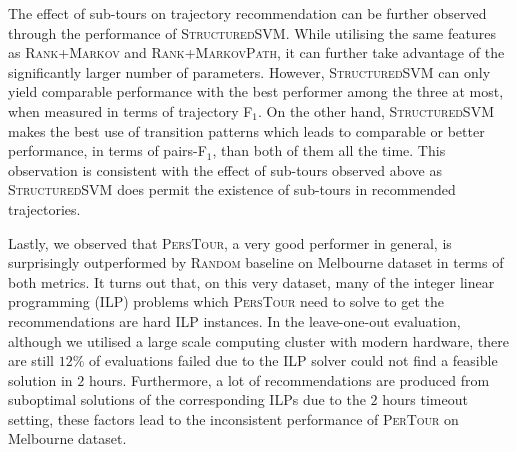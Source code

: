 The effect of sub-tours on trajectory recommendation can be further observed through the performance of \textsc{StructuredSVM}.
%
While utilising the same features as \textsc{Rank+Markov} and \textsc{Rank+MarkovPath},
it can further take advantage of the significantly larger number of parameters.
However, \textsc{StructuredSVM} can only yield comparable performance with the best performer 
among the three at most, when measured in terms of trajectory F$_1$.
On the other hand, \textsc{StructuredSVM} makes the best use of transition patterns which leads to comparable or
better performance, in terms of pairs-F$_1$, than both of them all the time.
This observation is consistent with the effect of sub-tours observed above
as \textsc{StructuredSVM} does permit the existence of sub-tours in recommended trajectories.

Lastly, we observed that \textsc{PersTour}, a very good performer in general, is surprisingly outperformed by \textsc{Random} baseline
on Melbourne dataset in terms of both metrics.
It turns out that, on this very dataset, many of the integer linear programming (ILP) problems
which \textsc{PersTour} need to solve to get the recommendations are hard ILP instances.
In the leave-one-out evaluation, although we utilised a large scale computing cluster with modern hardware,
there are still $12\%$ of evaluations failed due to the ILP solver could not find a feasible solution in $2$ hours.
Furthermore, a lot of recommendations are produced from suboptimal solutions of the corresponding ILPs due to
the $2$ hours timeout setting, these factors lead to the inconsistent performance of \textsc{PerTour} on Melbourne dataset.



